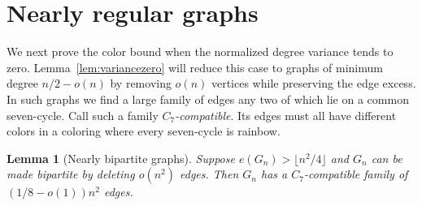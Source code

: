 \documentclass[10pt]{article}
\newtheorem{lem}[thm]{Lemma}
\theoremstyle{remark}
\begin{document}
\section{Nearly regular graphs}\label{sec:boundary}

We next prove the color bound when the normalized degree variance tends to zero. Lemma~\ref{lem:variancezero} will reduce this case to graphs of minimum degree $n/2-o(n)$ by removing $o(n)$ vertices while preserving the edge excess. In such graphs we find a large family of edges any two of which lie on a common seven-cycle. Call such a family \emph{$C_7$-compatible}. Its edges must all have different colors in a coloring where every seven-cycle is rainbow.

\begin{lem}[Nearly bipartite graphs]\label{lem:bipartite}
Suppose $e(G_n)>\lfloor n^2/4\rfloor$ and $G_n$ can be made bipartite by deleting $o(n^2)$ edges. Then $G_n$ has a $C_7$-compatible family of $(1/8-o(1))n^2$ edges.
\end{lem}
\end{document}
